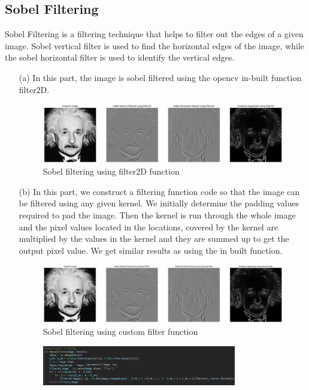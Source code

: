 \documentclass[11pt]{article}
\begin{document}
\begin{flushleft}
\section{Sobel Filtering}
Sobel Filtering is a filtering technique that helps to filter out the edges of a given image. Sobel vertical filter is used to find the horizontal edges of the image, while the sobel horizontal filter is used to identify the vertical edges.
\begin{itemize}
    \item[(a)] In this part, the image is sobel filtered using the opencv in-built function filter2D. 
    \begin{figure}[htp]
        \centering
        \includegraphics[width=1.\textwidth]{Filter2d.png}
        \caption{Sobel filtering using filter2D function}
    \end{figure}
    \item[(b)] In this part, we construct a filtering function code so that the image can be filtered using any given kernel. We initially determine the padding values required to pad the image. Then the kernel is run through the whole image and the pixel values located in the locations, covered by the kernel are multiplied by the values in the kernel and they are summed up to get the output pixel value. We get similar results as using the in built function.
    \begin{figure}[htp]
        \centering
        \includegraphics[width=1.\textwidth]{ManualFilter.png}
        \caption{Sobel filtering using custom filter function}
    \end{figure}
    \begin{figure}[htp]
        \centering
        \includegraphics[width=0.8\textwidth]{Question6bcode.png}

\end{figure}
\end{itemize}
\end{flushleft}
\end{document}
